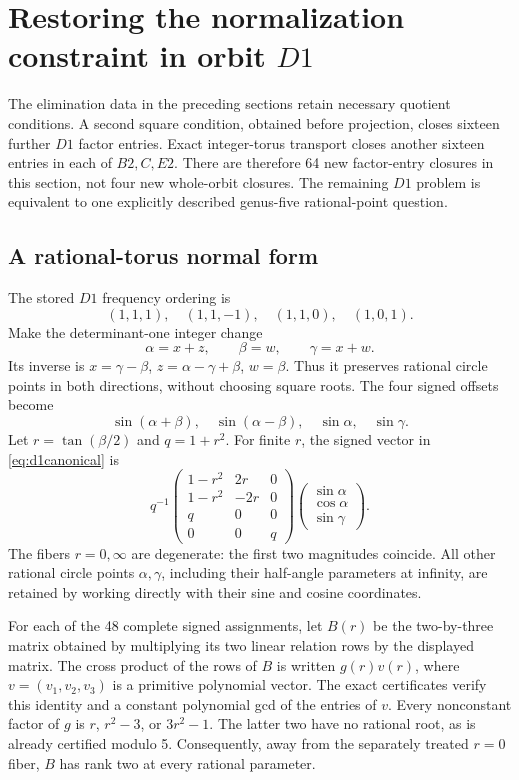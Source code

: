 \section{Restoring the normalization constraint in orbit $D1$}\label{sec:d1norm}
The elimination data in the preceding sections retain necessary quotient conditions. A second square condition, obtained before projection, closes sixteen further $D1$ factor entries. Exact integer-torus transport closes another sixteen entries in each of $B2,C,E2$. There are therefore 64 new factor-entry closures in this section, not four new whole-orbit closures. The remaining $D1$ problem is equivalent to one explicitly described genus-five rational-point question.

\subsection{A rational-torus normal form}
The stored $D1$ frequency ordering is
\[
 (1,1,1),\quad(1,1,-1),\quad(1,1,0),\quad(1,0,1).
\]
Make the determinant-one integer change
\[
 \alpha=x+z,\qquad\beta=w,\qquad\gamma=x+w.
\]
Its inverse is $x=\gamma-\beta$, $z=\alpha-\gamma+\beta$, $w=\beta$. Thus it preserves rational circle points in both directions, without choosing square roots. The four signed offsets become
\begin{equation}\label{eq:d1canonical}
 \sin(\alpha+\beta),\quad\sin(\alpha-\beta),\quad\sin\alpha,\quad\sin\gamma.
\end{equation}
Let $r=\tan(\beta/2)$ and $q=1+r^2$. For finite $r$, the signed vector in \eqref{eq:d1canonical} is
\[
 q^{-1}\begin{pmatrix}
 1-r^2&2r&0\\1-r^2&-2r&0\\q&0&0\\0&0&q
 \end{pmatrix}
 \begin{pmatrix}\sin\alpha\\\cos\alpha\\\sin\gamma\end{pmatrix}.
\]
The fibers $r=0,\infty$ are degenerate: the first two magnitudes coincide. All other rational circle points $\alpha,\gamma$, including their half-angle parameters at infinity, are retained by working directly with their sine and cosine coordinates.

For each of the 48 complete signed assignments, let $B(r)$ be the two-by-three matrix obtained by multiplying its two linear relation rows by the displayed matrix. The cross product of the rows of $B$ is written $g(r)v(r)$, where $v=(v_1,v_2,v_3)$ is a primitive polynomial vector. The exact certificates verify this identity and a constant polynomial gcd of the entries of $v$. Every nonconstant factor of $g$ is $r$, $r^2-3$, or $3r^2-1$. The latter two have no rational root, as is already certified modulo 5. Consequently, away from the separately treated $r=0$ fiber, $B$ has rank two at every rational parameter.

